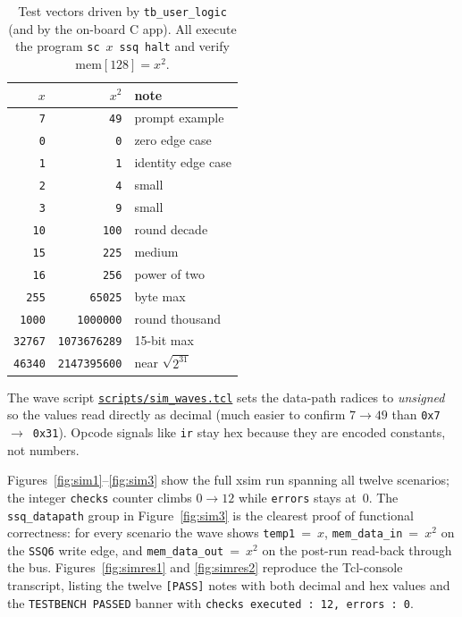 \documentclass[11pt,letterpaper]{article}
\begin{document}
\begin{table}[H]
    \centering
    \caption{Test vectors driven by \texttt{tb\_user\_logic} (and by
             the on-board C app).  All execute the program
             \texttt{sc}~\(x\)~\texttt{ssq}~\texttt{halt} and verify
             \(\mathrm{mem}[128]=x^{2}\).}
    \label{tab:vec}
    \small
    \begin{tabular}{rrl}
        \toprule
        \(x\) & \(x^{2}\) & note \\
        \midrule
        \texttt{7}     & \texttt{49}         & prompt example \\
        \texttt{0}     & \texttt{0}          & zero edge case \\
        \texttt{1}     & \texttt{1}          & identity edge case \\
        \texttt{2}     & \texttt{4}          & small \\
        \texttt{3}     & \texttt{9}          & small \\
        \texttt{10}    & \texttt{100}        & round decade \\
        \texttt{15}    & \texttt{225}        & medium \\
        \texttt{16}    & \texttt{256}        & power of two \\
        \texttt{255}   & \texttt{65025}      & byte max \\
        \texttt{1000}  & \texttt{1000000}    & round thousand \\
        \texttt{32767} & \texttt{1073676289} & 15-bit max \\
        \texttt{46340} & \texttt{2147395600} & near \(\sqrt{2^{31}}\) \\
        \bottomrule
    \end{tabular}
\end{table}

The wave script
\href{run:../stackprocessor_101/scripts/sim_waves.tcl}{\texttt{scripts/sim\_waves.tcl}}
sets the data-path radices to \emph{unsigned} so the values read
directly as decimal (much easier to confirm \(7 \to 49\) than
\texttt{0x7}~\(\to\)~\texttt{0x31}).  Opcode signals like \texttt{ir}
stay hex because they are encoded constants, not numbers.

Figures~\ref{fig:sim1}--\ref{fig:sim3} show the full xsim run spanning
all twelve scenarios; the integer \texttt{checks} counter climbs
\(0\to 12\) while \texttt{errors} stays at~\(0\).  The
\texttt{ssq\_datapath} group in Figure~\ref{fig:sim3} is the clearest
proof of functional correctness: for every scenario the wave shows
\texttt{temp1}~=~\(x\), \texttt{mem\_data\_in}~=~\(x^{2}\) on the
\texttt{SSQ6} write edge, and \texttt{mem\_data\_out}~=~\(x^{2}\) on
the post-run read-back through the bus.  Figures~\ref{fig:simres1} and
\ref{fig:simres2} reproduce the Tcl-console transcript, listing the
twelve \texttt{[PASS]} notes with both decimal and hex values and the
\texttt{TESTBENCH PASSED} banner with \texttt{checks executed : 12,
errors : 0}.
\end{document}
